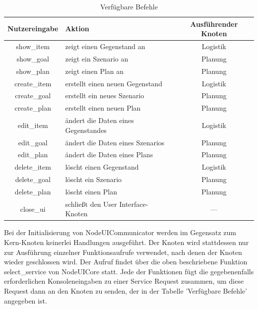 \begin{table}[h]
\begin{center}
\begin{tabular}{| c | l | c |}
  \hline
  Nutzereingabe & Aktion & Ausführender Knoten\\
  \hline
  \hline
  show\_item    & zeigt einen Gegenstand an           & Logistik \\
  show\_goal    & zeigt ein Szenario an               & Planung  \\
  show\_plan    & zeigt einen Plan an                 & Planung  \\
  create\_item  & erstellt einen neuen Gegenstand     & Logistik \\
  create\_goal  & erstellt ein neues Szenario         & Planung  \\
  create\_plan  & erstellt einen neuen Plan           & Planung  \\
  edit\_item    & ändert die Daten eines Gegenstandes & Logistik \\
  edit\_goal    & ändert die Daten eines Szenarios    & Planung  \\
  edit\_plan    & ändert die Daten eines Plans        & Planung  \\
  delete\_item  & löscht einen Gegenstand             & Logistik \\
  delete\_goal  & löscht ein Szenario                 & Planung  \\
  delete\_plan  & löscht einen Plan                   & Planung  \\
  close\_ui     & schließt den User Interface-Knoten  & ---      \\
  \hline
\end{tabular}
\caption{Verfügbare Befehle}
\end{center}
\end{table}

Bei der Initialisierung von NodeUICommunicator werden im Gegensatz zum Kern-Knoten keinerlei Handlungen ausgeführt. Der Knoten wird stattdessen nur zur Ausführung einzelner Funktionsaufrufe verwendet, nach denen der Knoten wieder geschlossen wird. Der Aufruf findet über die oben beschriebene Funktion select\_service von NodeUICore statt. Jede der Funktionen fügt die gegebenenfalls erforderlichen Konsoleneingaben zu einer Service Request zusammen, um diese Request dann an den Knoten zu senden, der in der Tabelle 'Verfügbare Befehle' angegeben ist.

